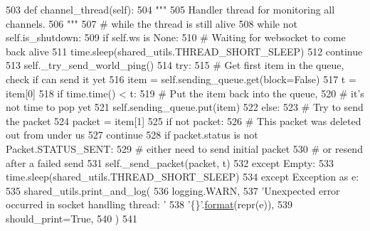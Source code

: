 \begin{DoxyCode}
503     \textcolor{keyword}{def }channel\_thread(self):
504         \textcolor{stringliteral}{"""}
505 \textcolor{stringliteral}{        Handler thread for monitoring all channels.}
506 \textcolor{stringliteral}{        """}
507         \textcolor{comment}{# while the thread is still alive}
508         \textcolor{keywordflow}{while} \textcolor{keywordflow}{not} self.is\_shutdown:
509             \textcolor{keywordflow}{if} self.ws \textcolor{keywordflow}{is} \textcolor{keywordtype}{None}:
510                 \textcolor{comment}{# Waiting for websocket to come back alive}
511                 time.sleep(shared\_utils.THREAD\_SHORT\_SLEEP)
512                 \textcolor{keywordflow}{continue}
513             self.\_try\_send\_world\_ping()
514             \textcolor{keywordflow}{try}:
515                 \textcolor{comment}{# Get first item in the queue, check if can send it yet}
516                 item = self.sending\_queue.get(block=\textcolor{keyword}{False})
517                 t = item[0]
518                 \textcolor{keywordflow}{if} time.time() < t:
519                     \textcolor{comment}{# Put the item back into the queue,}
520                     \textcolor{comment}{# it's not time to pop yet}
521                     self.sending\_queue.put(item)
522                 \textcolor{keywordflow}{else}:
523                     \textcolor{comment}{# Try to send the packet}
524                     packet = item[1]
525                     \textcolor{keywordflow}{if} \textcolor{keywordflow}{not} packet:
526                         \textcolor{comment}{# This packet was deleted out from under us}
527                         \textcolor{keywordflow}{continue}
528                     \textcolor{keywordflow}{if} packet.status \textcolor{keywordflow}{is} \textcolor{keywordflow}{not} Packet.STATUS\_SENT:
529                         \textcolor{comment}{# either need to send initial packet}
530                         \textcolor{comment}{# or resend after a failed send}
531                         self.\_send\_packet(packet, t)
532             \textcolor{keywordflow}{except} Empty:
533                 time.sleep(shared\_utils.THREAD\_SHORT\_SLEEP)
534             \textcolor{keywordflow}{except} Exception \textcolor{keyword}{as} e:
535                 shared\_utils.print\_and\_log(
536                     logging.WARN,
537                     \textcolor{stringliteral}{'Unexpected error occurred in socket handling thread: '}
538                     \textcolor{stringliteral}{'\{\}'}.\hyperlink{namespaceparlai_1_1chat__service_1_1services_1_1messenger_1_1shared__utils_a32e2e2022b824fbaf80c747160b52a76}{format}(repr(e)),
539                     should\_print=\textcolor{keyword}{True},
540                 )
541 
\end{DoxyCode}
